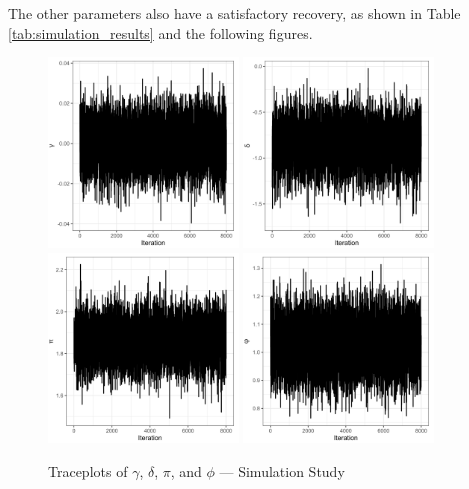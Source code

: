 The other parameters also have a satisfactory recovery, as shown in Table \ref{tab:simulation_results} and the following figures. 

\begin{figure}[H]
    \centering
    \includegraphics[width=0.45\textwidth]{../figures/simulation/trace_gamma.png}
    \includegraphics[width=0.45\textwidth]{../figures/simulation/trace_delta.png}
    \includegraphics[width=0.45\textwidth]{../figures/simulation/trace_pi.png}
    \includegraphics[width=0.45\textwidth]{../figures/simulation/trace_phi.png}
    \caption{Traceplots of $\gamma$, $\delta$, $\pi$, and $\phi$ --- Simulation Study}
    \label{fig:posterior_traceplots_2}
    \end{figure}
    
